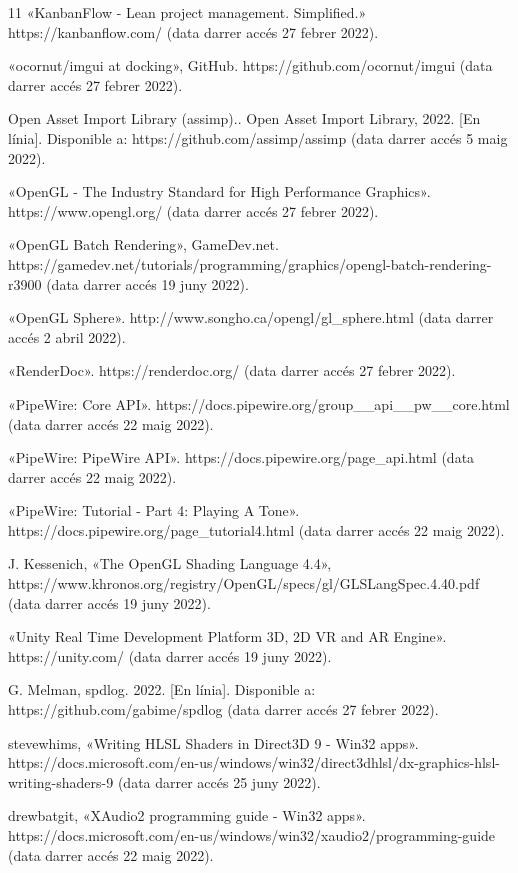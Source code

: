 ﻿\documentclass[10pt,a4paper,twocolumn,twoside]{article}
\begin{document}
\begin{thebibliography}{11}
    «KanbanFlow - Lean project management. Simplified.» https://kanbanflow.com/ (data darrer accés 27 febrer 2022).

    «ocornut/imgui at docking», GitHub. https://github.com/ocornut/imgui (data darrer accés 27 febrer 2022).

    Open Asset Import Library (assimp).. Open Asset Import Library, 2022. [En línia]. Disponible a: https://github.com/assimp/assimp (data darrer accés 5 maig 2022).

    «OpenGL - The Industry Standard for High Performance Graphics». https://www.opengl.org/ (data darrer accés 27 febrer 2022).

    «OpenGL Batch Rendering», GameDev.net. https://gamedev.net/tutorials/programming/graphics/opengl-batch-rendering-r3900 (data darrer accés 19 juny 2022).

    «OpenGL Sphere». http://www.songho.ca/opengl/gl\_sphere.html (data darrer accés 2 abril 2022).

    «RenderDoc». https://renderdoc.org/ (data darrer accés 27 febrer 2022).

    «PipeWire: Core API». https://docs.pipewire.org/group\_\_api\_\_pw\_\_core.html (data darrer accés 22 maig 2022).

    «PipeWire: PipeWire API». https://docs.pipewire.org/page\_api.html (data darrer accés 22 maig 2022).

    «PipeWire: Tutorial - Part 4: Playing A Tone». https://docs.pipewire.org/page\_tutorial4.html (data darrer accés 22 maig 2022).

    J. Kessenich, «The OpenGL Shading Language 4.4», https://www.khronos.org/registry/OpenGL/specs/gl/GLSLangSpec.4.40.pdf (data darrer accés 19 juny 2022).

    «Unity Real Time Development Platform 3D, 2D VR and AR Engine». https://unity.com/ (data darrer accés 19 juny 2022).

    G. Melman, spdlog. 2022. [En línia]. Disponible a: https://github.com/gabime/spdlog (data darrer accés 27 febrer 2022).

    stevewhims, «Writing HLSL Shaders in Direct3D 9 - Win32 apps». https://docs.microsoft.com/en-us/windows/win32/direct3dhlsl/dx-graphics-hlsl-writing-shaders-9 (data darrer accés 25 juny 2022).

    drewbatgit, «XAudio2 programming guide - Win32 apps». https://docs.microsoft.com/en-us/windows/win32/xaudio2/programming-guide (data darrer accés 22 maig 2022).

\end{thebibliography}
\end{document}
